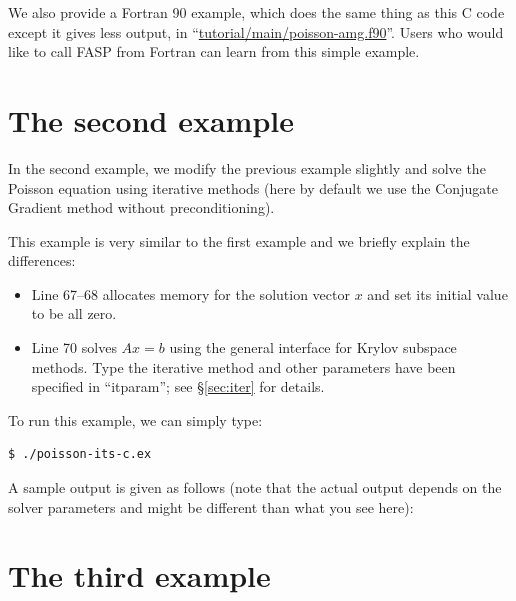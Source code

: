 \documentclass[11pt]{memoir}
\begin{document}
We also provide a Fortran 90 example, which does the same thing as this C code except it gives less output, in ``\url{tutorial/main/poisson-amg.f90}''. Users who would like to call FASP from Fortran can learn from this simple example. 
%

%

\section{The second example}\label{sec:ex2}

In the second example, we modify the previous example slightly and solve the Poisson equation using iterative methods (here by default we use the Conjugate Gradient method without preconditioning).
%

%
This example is very similar to the first example and we briefly explain the differences:
\begin{itemize}
%
\item Line 67--68 allocates memory for the solution vector $x$ and set its initial value to be all zero.
%
\item Line 70 solves $Ax=b$ using the general interface for Krylov subspace methods. Type the iterative method and other parameters have been specified in ``itparam''; see \S\ref{sec:iter} for details.
%
\end{itemize}
%
To run this example, we can simply type:
%
\begin{lstlisting}[numbers=none]
$ ./poisson-its-c.ex
\end{lstlisting}
%
A sample output is given as follows (note that the actual output depends on the solver parameters and might be different than what you see here):


\section{The third example}\label{sec:ex3}
\end{document}
